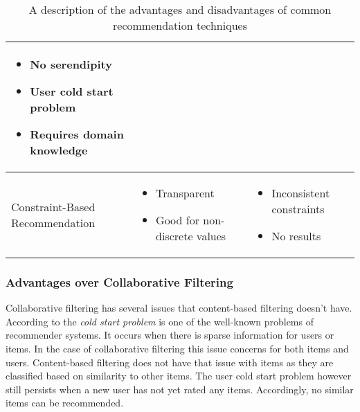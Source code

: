 \begin{table}
\begin{center}
\begin{tabularx}{\columnwidth}{X|X|X}
\begin{itemize}[noitemsep,topsep=0pt,parsep=0pt,partopsep=0pt, leftmargin=3.5mm]
                    \item No serendipity
                    \item User cold start problem
                    \item Requires domain knowledge
                \end{itemize} \\
            \hline
            Constraint-Based Recommendation 
            &   \begin{itemize}[noitemsep,topsep=0pt,parsep=0pt,partopsep=0pt, leftmargin=3.5mm]
                    \item Transparent
                    \item Good for non-discrete values
                \end{itemize}
            &   \begin{itemize}[noitemsep,topsep=0pt,parsep=0pt,partopsep=0pt, leftmargin=3.5mm]
                    \item Inconsistent constraints
                    \item No results
                \end{itemize} \\ 
        \end{tabularx}
        \caption[Comparison of Recommendation Approaches]{A description of the advantages and disadvantages of common recommendation techniques \cite{richthammerSituationAwarenessRecommender2018, shokeenStudyFeaturesSocial2019,hahslerRecommenderlabFrameworkDeveloping2015, aminiDiscoveringImpactKnowledge2011, suSurveyCollaborativeFiltering2009}}
        \label{tab:Foundations:RecommenderComparison}
    \end{center}
\end{table}

\subsubsection{Advantages over Collaborative Filtering}

Collaborative filtering has several issues that content-based filtering doesn't have. According to \citeauthor{likaFacingColdStart2014} \cite{likaFacingColdStart2014} the \emph{cold start problem} is one of the well-known problems of recommender systems. It occurs when there is sparse information for users or items. In the case of collaborative filtering this issue concerns for both items and users. Content-based filtering does not have that issue with items as they are classified based on similarity to other items. The user cold start problem however still persists when a new user has not yet rated any items. Accordingly, no similar items can be recommended.

